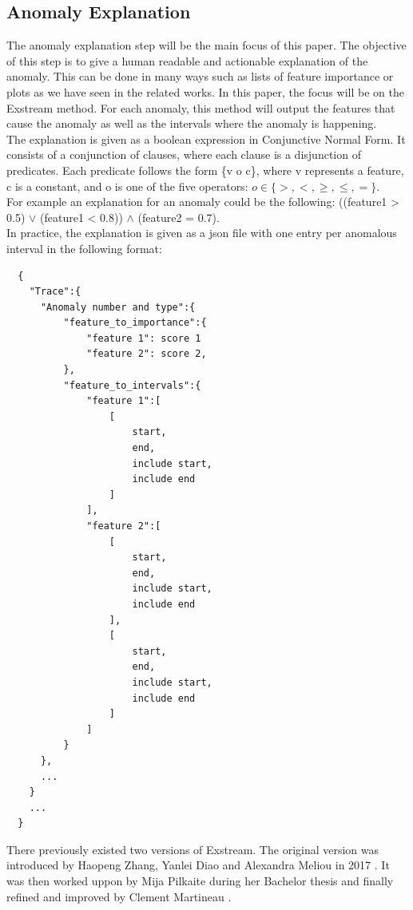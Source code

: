 \documentclass[oneside, a4paper, onecolumn, 11pt]{article}
\begin{document}
\subsection{Anomaly Explanation}
The anomaly explanation step will be the main focus of this paper. The objective of this step is to give a human readable and actionable explanation of the anomaly. This can be done in many ways such as lists of feature importance or plots as we have seen in the related works. In this paper, the focus will be on the Exstream method. For each anomaly, this method will output the features that cause the anomaly as well as the intervals where the anomaly is happening.\\
The explanation is given as a boolean expression in Conjunctive Normal Form. It consists of a conjunction of clauses, where each clause is a disjunction of predicates. Each predicate follows the form \{v o c\}, where v represents a feature, c is a constant, and o is one of the five operators: $o\in\{>, <, \geq, \leq, =\}$.\\
For example an explanation for an anomaly could be the following: ((feature1 > 0.5) $\lor$ (feature1 < 0.8)) $\land$ (feature2 = 0.7).\\
In practice, the explanation is given as a json file with one entry per anomalous interval in the following format:
\begin{verbatim}
  {
    "Trace":{
      "Anomaly number and type":{
          "feature_to_importance":{
              "feature 1": score 1
              "feature 2": score 2,
          },
          "feature_to_intervals":{
              "feature 1":[
                  [
                      start,
                      end,
                      include start,
                      include end
                  ]
              ],
              "feature 2":[
                  [
                      start,
                      end,
                      include start,
                      include end
                  ],
                  [
                      start,
                      end,
                      include start,
                      include end
                  ]
              ]
          }
      },
      ...
    }
    ...
  }
\end{verbatim}
\label{explanation_format}
There previously existed two versions of Exstream. The original version was introduced by Haopeng Zhang, Yanlei Diao and Alexandra Meliou  in 2017 \cite{Exstream}. It was then worked uppon by Mija Pilkaite during her Bachelor thesis \cite{MijaExstream} and finally refined and improved by Clement Martineau \cite{ClementExstream}.\\
\end{document}
